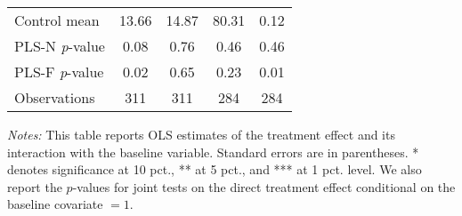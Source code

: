 \begin{table}[ht]
{\begin{threeparttable}
\begin{tabular}{l*{4}{c}}
Control mean    &    13.66         &    14.87         &    80.31         &     0.12         \\
PLS-N \emph{p}-value&     0.08         &     0.76         &     0.46         &     0.46         \\
PLS-F \emph{p}-value&     0.02         &     0.65         &     0.23         &     0.01         \\
Observations    &      311         &      311         &      284         &      284         \\
\bottomrule \end{tabular} \begin{tablenotes}[flushleft] \footnotesize \item \emph{Notes:} This table reports OLS estimates of the treatment effect and its interaction with the baseline variable. Standard errors are in parentheses. * denotes significance at 10 pct., ** at 5 pct., and *** at 1 pct. level. We also report the \(p\)-values for joint tests on the direct treatment effect conditional on the baseline covariate $= 1$. \end{tablenotes} \end{threeparttable} } \end{table}

